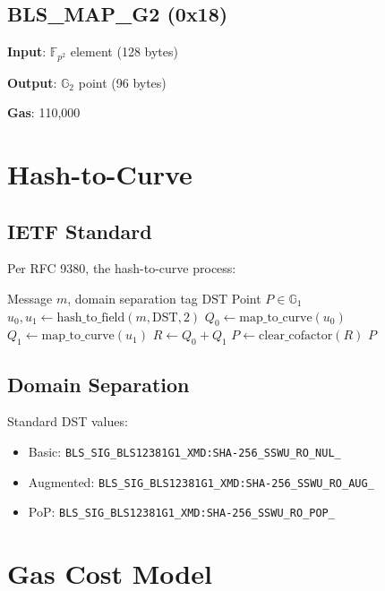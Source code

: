 \documentclass[11pt,a4paper]{article}
\theoremstyle{definition}
\begin{document}
\subsection{BLS\_MAP\_G2 (0x18)}

\textbf{Input}: $\mathbb{F}_{p^2}$ element (128 bytes)

\textbf{Output}: $\mathbb{G}_2$ point (96 bytes)

\textbf{Gas}: 110,000

\section{Hash-to-Curve}

\subsection{IETF Standard}

Per RFC 9380, the hash-to-curve process:

\begin{algorithm}
\caption{Hash to G1}
\begin{algorithmic}[1]
\Require Message $m$, domain separation tag $\text{DST}$
\Ensure Point $P \in \mathbb{G}_1$
\State $u_0, u_1 \gets \text{hash\_to\_field}(m, \text{DST}, 2)$
\State $Q_0 \gets \text{map\_to\_curve}(u_0)$ 
\State $Q_1 \gets \text{map\_to\_curve}(u_1)$
\State $R \gets Q_0 + Q_1$
\State $P \gets \text{clear\_cofactor}(R)$
\Return $P$
\end{algorithmic}
\end{algorithm}

\subsection{Domain Separation}

Standard DST values:
\begin{itemize}
    \item Basic: \texttt{BLS\_SIG\_BLS12381G1\_XMD:SHA-256\_SSWU\_RO\_NUL\_}
    \item Augmented: \texttt{BLS\_SIG\_BLS12381G1\_XMD:SHA-256\_SSWU\_RO\_AUG\_}
    \item PoP: \texttt{BLS\_SIG\_BLS12381G1\_XMD:SHA-256\_SSWU\_RO\_POP\_}
\end{itemize}

\section{Gas Cost Model}
\end{document}
